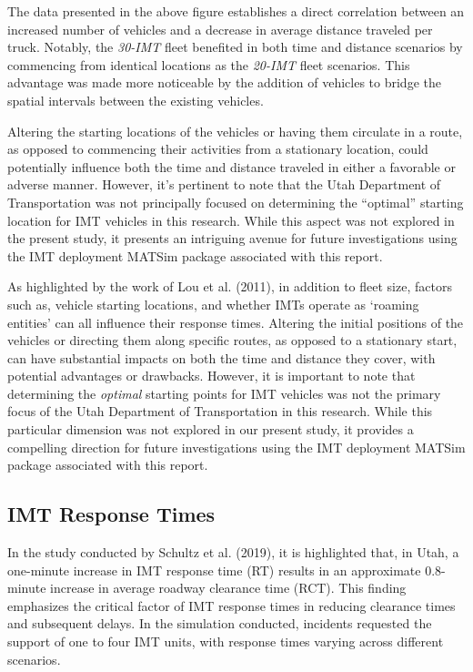 \documentclass[fancy, oneside, mastersfancy, ms]{byuthesis}
\begin{document}
The data presented in the above figure establishes a direct correlation
between an increased number of vehicles and a decrease in average
distance traveled per truck. Notably, the \emph{30-IMT} fleet benefited
in both time and distance scenarios by commencing from identical
locations as the \emph{20-IMT} fleet scenarios. This advantage was made
more noticeable by the addition of vehicles to bridge the spatial
intervals between the existing vehicles.

Altering the starting locations of the vehicles or having them circulate
in a route, as opposed to commencing their activities from a stationary
location, could potentially influence both the time and distance
traveled in either a favorable or adverse manner. However, it's
pertinent to note that the Utah Department of Transportation was not
principally focused on determining the ``optimal'' starting location for
IMT vehicles in this research. While this aspect was not explored in the
present study, it presents an intriguing avenue for future
investigations using the IMT deployment MATSim package associated with
this report.

As highlighted by the work of Lou et al. (2011), in addition to fleet
size, factors such as, vehicle starting locations, and whether IMTs
operate as `roaming entities' can all influence their response times.
Altering the initial positions of the vehicles or directing them along
specific routes, as opposed to a stationary start, can have substantial
impacts on both the time and distance they cover, with potential
advantages or drawbacks. However, it is important to note that
determining the \emph{optimal} starting points for IMT vehicles was not
the primary focus of the Utah Department of Transportation in this
research. While this particular dimension was not explored in our
present study, it provides a compelling direction for future
investigations using the IMT deployment MATSim package associated with
this report.

\hypertarget{imt-response-times}{%
\subsection{IMT Response Times}\label{imt-response-times}}

In the study conducted by Schultz et al. (2019), it is highlighted that,
in Utah, a one-minute increase in IMT response time (RT) results in an
approximate 0.8-minute increase in average roadway clearance time (RCT).
This finding emphasizes the critical factor of IMT response times in
reducing clearance times and subsequent delays. In the simulation
conducted, incidents requested the support of one to four IMT units,
with response times varying across different scenarios.
\end{document}

